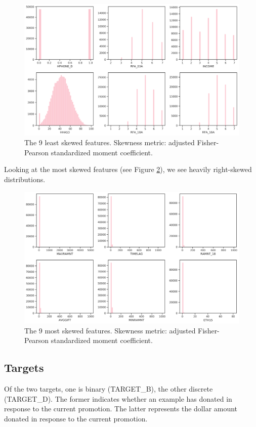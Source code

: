 \documentclass[
  11pt,
  a4paper,
  DIV=12,captions=tableheading,oneside]{scrbook}
\begin{document}
\begin{figure}

{\centering \includegraphics[width=0.7\linewidth]{figures/eda/least-skewed} 

}

\caption{The 9 least skewed features. Skewness metric: adjusted Fisher-Pearson standardized moment coefficient.}\label{fig:least-skewed}
\end{figure}

Looking at the most skewed features (see Figure \ref{fig:most-skewed}), we see heavily right-skewed distributions.

\begin{figure}

{\centering \includegraphics[width=0.7\linewidth]{figures/eda/most-skewed} 

}

\caption{The 9 most skewed features. Skewness metric: adjusted Fisher-Pearson standardized moment coefficient.}\label{fig:most-skewed}
\end{figure}

\hypertarget{targets}{%
\subsection{Targets}\label{targets}}

Of the two targets, one is binary (TARGET\_B), the other discrete (TARGET\_D). The former indicates whether an example has donated in response to the current promotion. The latter represents the dollar amount donated in response to the current promotion.
\end{document}
